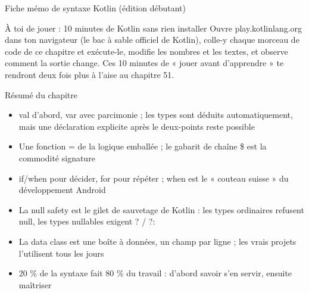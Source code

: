 \begin{center}\small\color{gray}Fiche mémo de syntaxe Kotlin (édition débutant)\end{center}

\begin{tcbpractice}{À toi de jouer : 10 minutes de Kotlin sans rien installer}
Ouvre play.kotlinlang.org dans ton navigateur (le bac à sable officiel de Kotlin), colle-y chaque morceau de code de ce chapitre et exécute-le, modifie les nombres et les textes, et observe comment la sortie change. Ces 10 minutes de « jouer avant d'apprendre » te rendront deux fois plus à l'aise au chapitre 51.

\end{tcbpractice}

\begin{tcbsummary}{Résumé du chapitre}
\begin{itemize}
  \item val d'abord, var avec parcimonie ; les types sont déduits automatiquement, mais une déclaration explicite après le deux-points reste possible
  \item Une fonction = de la logique emballée ; le gabarit de chaîne \$ est la commodité signature
  \item if/when pour décider, for pour répéter ; when est le « couteau suisse » du développement Android
  \item La null safety est le gilet de sauvetage de Kotlin : les types ordinaires refusent null, les types nullables exigent ? / ?:
  \item La data class est une boîte à données, un champ par ligne ; les vrais projets l'utilisent tous les jours
  \item 20 \% de la syntaxe fait 80 \% du travail : d'abord savoir s'en servir, ensuite maîtriser
\end{itemize}

\end{tcbsummary}
